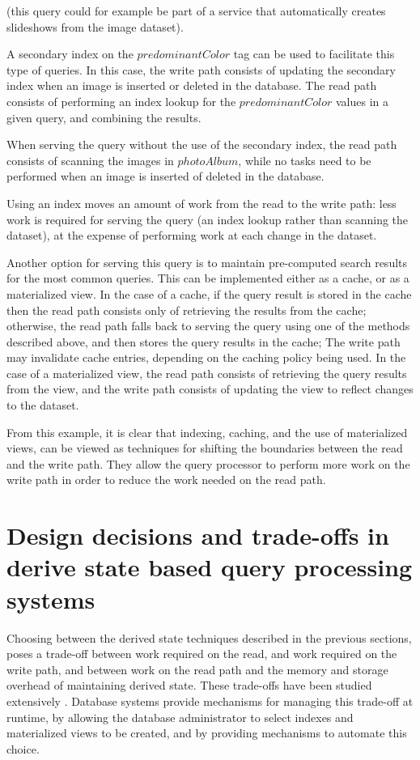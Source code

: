 \noindent
(this query could for example be part of a service that automatically creates slideshows from the image dataset).

A secondary index on the $predominantColor$ tag can be used to facilitate this type of queries.
In this case, the write path consists of updating the secondary index when an image is inserted or deleted in the database.
The read path consists of performing an index lookup for the $predominantColor$ values in a given query,
and combining the results.

When serving the query without the use of the secondary index, the read path consists of scanning the images in $photoAlbum$,
while no tasks need to be performed when an image is inserted of deleted in the database.

Using an index moves an amount of work from the read to the write path:
less work is required for serving the query (an index lookup rather than scanning the dataset), at the expense of performing
work at each change in the dataset.

Another option for serving this query is to maintain pre-computed search results for the most common queries.
This can be implemented either as a cache, or as a materialized view.
In the case of a cache, if the query result is stored in the cache then the read path consists only of retrieving the
results from the cache;
otherwise, the read path falls back to serving the query using one of the methods described above,
and then stores the query results in the cache;
The write path may invalidate cache entries, depending on the caching policy being used.
In the case of a materialized view, the read path consists of retrieving the query results from the view,
and the write path consists of updating the view to reflect changes to the dataset.

From this example, it is clear that indexing, caching, and the use of materialized views,
can be viewed as techniques for shifting the boundaries between the read and the write path.
They allow the query processor to perform more work on the write path in order to reduce the work needed on the read path.


\section{Design decisions and trade-offs in derive state based query processing systems}

Choosing between the derived state techniques described in the previous sections,
poses a trade-off between work required on the read, and work required on the write path,
and between work on the read path and the memory and storage overhead of maintaining derived state.
These trade-offs have been studied extensively \cite{valentin:db2advisor, chaudhuri:decadeselftuning}.
Database systems provide mechanisms for managing this trade-off at runtime, by allowing the database administrator
to select indexes and materialized views to be created, and by providing mechanisms to automate this choice.

